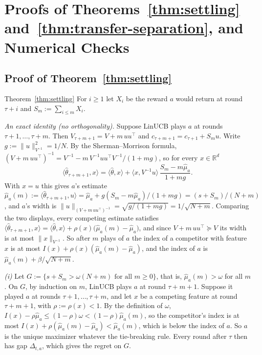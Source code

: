 \documentclass[anon]{alt2027} %
\newcommand{\R}{\mathbb{R}}
\begin{document}
\section{Proofs of Theorems~\ref{thm:settling} and~\ref{thm:transfer-separation}, and Numerical Checks}
\label{app:proof-transfer-sep}

\subsection{Proof of Theorem~\ref{thm:settling}}
\label{app:proof-settling}

\begin{proofof}{Theorem~\ref{thm:settling}}
For $i\ge1$ let $X_i$ be the reward $a$ would return at round $\tau+i$ and
$S_m:=\sum_{i\le m}X_i$.

\emph{An exact identity (no orthogonality).} Suppose LinUCB plays $a$ at
rounds $\tau+1,\dots,\tau+m$. Then $V_{\tau+m+1}=V+m\,uu^\top$ and
$c_{\tau+m+1}=c_{\tau+1}+S_mu$. Write $g:=\|u\|^2_{V^{-1}}=1/N$. By the
Sherman--Morrison formula,
$(V+m\,uu^\top)^{-1}=V^{-1}-m\,V^{-1}uu^\top V^{-1}/(1+mg)$, so for every
$x\in\R^d$
\[
\langle\widehat\theta_{\tau+m+1},x\rangle
=\langle\widehat\theta,x\rangle+\langle x,V^{-1}u\rangle\,\frac{S_m-m\widehat\mu_a}{1+mg}.
\]
With $x=u$ this gives $a$'s estimate
$\widehat\mu_a(m):=\langle\widehat\theta_{\tau+m+1},u\rangle=\widehat\mu_a+g(S_m-m\widehat\mu_a)/(1+mg)=(s+S_m)/(N+m)$,
and $a$'s width is $\|u\|_{(V+m\,uu^\top)^{-1}}=\sqrt{g/(1+mg)}=1/\sqrt{N+m}$.
Comparing the two displays, every competing estimate satisfies
$\langle\widehat\theta_{\tau+m+1},x\rangle=\langle\widehat\theta,x\rangle+\rho(x)\bigl(\widehat\mu_a(m)-\widehat\mu_a\bigr)$,
and since $V+m\,uu^\top\succeq V$ its width is at most
$\|x\|_{V^{-1}}$. So after $m$ plays of $a$ the index of a competitor with
feature $x$ is at most $I(x)+\rho(x)(\widehat\mu_a(m)-\widehat\mu_a)$, and the
index of $a$ is $\widehat\mu_a(m)+\beta/\sqrt{N+m}$.

\emph{(i)} Let $G:=\{s+S_m>\omega(N+m)\text{ for all }m\ge0\}$, that is,
$\widehat\mu_a(m)>\omega$ for all $m$. On $G$, by induction on $m$, LinUCB
plays $a$ at round $\tau+m+1$. Suppose it played $a$ at rounds
$\tau+1,\dots,\tau+m$, and let $x$ be a competing feature at round
$\tau+m+1$, with $\rho:=\rho(x)<1$. By the definition of $\omega$,
$I(x)-\rho\widehat\mu_a\le(1-\rho)\omega<(1-\rho)\widehat\mu_a(m)$, so the
competitor's index is at most
$I(x)+\rho(\widehat\mu_a(m)-\widehat\mu_a)<\widehat\mu_a(m)$, which is below
the index of $a$. So $a$ is the unique maximizer whatever the tie-breaking
rule. Every round after $\tau$ then has gap $\Delta_{t,a}$, which gives the
regret on $G$.


\end{proofof}
\end{document}

